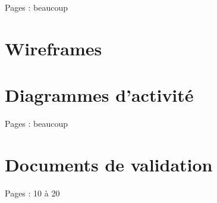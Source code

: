 \documentclass{EPL-master-thesis-covers-FR}
\begin{document}
		Pages : beaucoup

	\chapter{Wireframes}
		\label{sec:wireframes}
		

	\chapter{Diagrammes d'activité}

		Pages : beaucoup

	\chapter{Documents de validation}
		Pages : 10 à 20
	\setlength{\parskip}{0em}
	\backcoverpage
\end{document}
